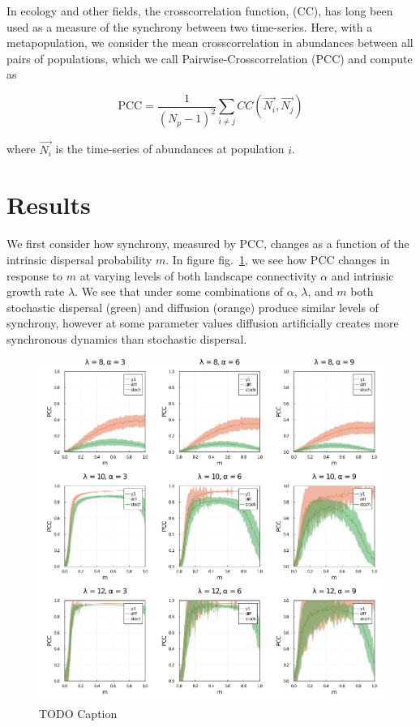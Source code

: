 \documentclass[11pt]{article}
\makeatletter
\def\maxwidth{\ifdim\Gin@nat@width>\linewidth\linewidth
\else\Gin@nat@width\fi}
\let\Oldincludegraphics\includegraphics
\renewcommand{\includegraphics}[1]{\Oldincludegraphics[width=\maxwidth]{#1}}
\makeatother
\begin{document}
In ecology and other fields, the crosscorrelation function, (CC), has
long been used as a measure of the synchrony between two time-series.
Here, with a metapopulation, we consider the mean crosscorrelation in
abundances between all pairs of populations, which we call
Pairwise-Crosscorrelation (\(\text{PCC}\)) and compute as

\[\text{PCC}=\frac{1}{(N_p-1)^2}\sum_{i \neq j} CC(\vec{N_i},\vec{N_j})\]

where \(\vec{N_i}\) is the time-series of abundances at population
\(i\).

\hypertarget{results}{%
\section{Results}\label{results}}

We first consider how synchrony, measured by \(\text{PCC}\), changes as
a function of the intrinsic dispersal probability \(m\). In figure
fig.~\ref{fig:migration_gradient}, we see how \(\text{PCC}\) changes in
response to \(m\) at varying levels of both landscape connectivity
\(\alpha\) and intrinsic growth rate \(\lambda\). We see that under some
combinations of \(\alpha\), \(\lambda\), and \(m\) both stochastic
dispersal (green) and diffusion (orange) produce similar levels of
synchrony, however at some parameter values diffusion artificially
creates more synchronous dynamics than stochastic dispersal.

\begin{figure}
\hypertarget{fig:migration_gradient}{%
\centering
\includegraphics{./figures/migration_gradient_panels.png}
\caption{TODO Caption}\label{fig:migration_gradient}
}
\end{figure}
\end{document}
